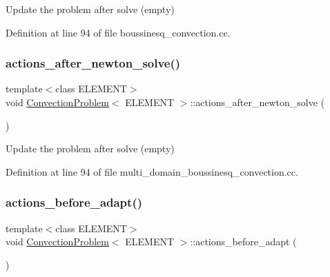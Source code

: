 Update the problem after solve (empty) 



Definition at line 94 of file boussinesq\+\_\+convection.\+cc.

\mbox{\label{classConvectionProblem_a6b6c035decf5f1e2aa64b591563e5ae4}} 
\subsubsection{\texorpdfstring{actions\+\_\+after\+\_\+newton\+\_\+solve()}{actions\_after\_newton\_solve()}\hspace{0.1cm}{\footnotesize\ttfamily [2/2]}}
{\footnotesize\ttfamily template$<$class E\+L\+E\+M\+E\+NT$>$ \\
void \hyperlink{classConvectionProblem}{Convection\+Problem}$<$ E\+L\+E\+M\+E\+NT $>$\+::actions\+\_\+after\+\_\+newton\+\_\+solve (\begin{DoxyParamCaption}{ }\end{DoxyParamCaption})\hspace{0.3cm}{\ttfamily [inline]}}



Update the problem after solve (empty) 



Definition at line 94 of file multi\+\_\+domain\+\_\+boussinesq\+\_\+convection.\+cc.

\mbox{\label{classConvectionProblem_ac546cecdb98a75923d0a5af4b0a223a1}} 
\subsubsection{\texorpdfstring{actions\+\_\+before\+\_\+adapt()}{actions\_before\_adapt()}\hspace{0.1cm}{\footnotesize\ttfamily [1/2]}}
{\footnotesize\ttfamily template$<$class E\+L\+E\+M\+E\+NT$>$ \\
void \hyperlink{classConvectionProblem}{Convection\+Problem}$<$ E\+L\+E\+M\+E\+NT $>$\+::actions\+\_\+before\+\_\+adapt (\begin{DoxyParamCaption}{ }\end{DoxyParamCaption})\hspace{0.3cm}{\ttfamily [inline]}}



